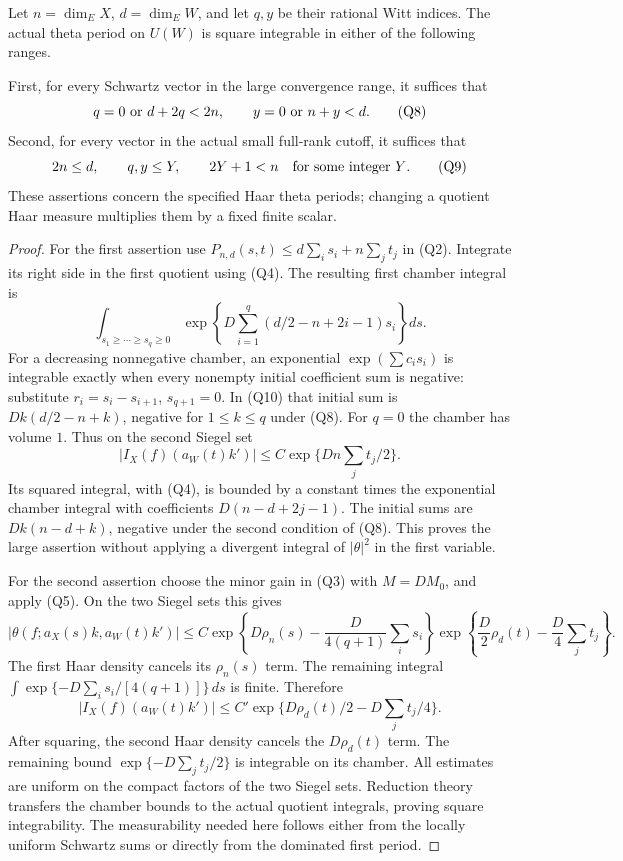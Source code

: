 \begin{srproposition}
\label{prop:sr-theta-period-L2}
Let \(n=\dim_E X\), \(d=\dim_E W\), and let \(q,y\) be their
rational Witt indices. The actual theta period on \(U(W)\) is
square integrable in either of the following ranges.

First, for every Schwartz vector in the large convergence range,
it suffices that
\[
          q=0\ \hbox{or}\ d+2q<2n,\qquad
          y=0\ \hbox{or}\ n+y<d .
 \tag{Q8}\label{eq:sr-theta-period-L2-large-range}
\]
Second, for every vector in the actual small full-rank cutoff,
it suffices that
\[
       2n\le d,\qquad
       q,y\le Y,\qquad 2Y+1<n
                     \quad\hbox{for some integer \(Y\)}.
 \tag{Q9}\label{eq:sr-theta-period-L2-small-range}
\]
These assertions concern the specified Haar theta periods; changing a
quotient Haar measure multiplies them by a fixed finite scalar.
\end{srproposition}

\begin{proof}
For the first assertion use
\(P_{n,d}(s,t)\le d\sum_i s_i+n\sum_jt_j\) in (Q2).
Integrate its right side in the first quotient using (Q4).
The resulting first chamber integral is
\[
 \int_{s_1\ge\cdots\ge s_q\ge0}
   \exp\left\{D\sum_{i=1}^q(d/2-n+2i-1)s_i\right\}ds.
 \tag{Q10}\label{eq:sr-theta-period-L2-first-integral}
\]
For a decreasing nonnegative chamber, an exponential
\(\exp(\sum c_i s_i)\) is integrable exactly when every nonempty
initial coefficient sum is negative: substitute
\(r_i=s_i-s_{i+1}\), \(s_{q+1}=0\).
In (Q10) that initial sum is
\(Dk(d/2-n+k)\), negative for \(1\le k\le q\) under (Q8).
For \(q=0\) the chamber has volume \(1\).
Thus on the second Siegel set
\[
        |I_X(f)(a_W(t)k')|
               \le C\exp\{Dn\sum_jt_j/2\}.
\]
Its squared integral, with (Q4), is bounded by a constant times the
exponential chamber integral with coefficients
\(D(n-d+2j-1)\). The initial sums are \(Dk(n-d+k)\),
negative under the second condition of (Q8). This proves the large
assertion without applying a divergent integral of \(|\theta|^2\)
in the first variable.

For the second assertion choose the minor gain in (Q3) with
\(M=DM_0\), and apply (Q5). On the two Siegel sets this gives
\[
 |\theta(f;a_X(s)k,a_W(t)k')|
 \le C
 \exp\left\{D\rho_n(s)-\frac{D}{4(q+1)}\sum_i s_i\right\}
 \exp\left\{\frac D2\rho_d(t)-\frac D4\sum_j t_j\right\}.
 \tag{Q11}\label{eq:sr-theta-period-L2-separated}
\]
The first Haar density cancels its \(\rho_n(s)\) term.
The remaining integral
\(\int\exp\{-D\sum_i s_i/[4(q+1)]\}\,ds\) is finite.
Therefore
\[
 |I_X(f)(a_W(t)k')|
       \le C'\exp\{D\rho_d(t)/2-D\sum_jt_j/4\}.
\]
After squaring, the second Haar density cancels the
\(D\rho_d(t)\) term. The remaining bound
\(\exp\{-D\sum_jt_j/2\}\) is integrable on its chamber.
All estimates are uniform on the compact factors of the two
Siegel sets. Reduction theory transfers the chamber bounds to
the actual quotient integrals, proving square integrability.
The measurability needed here follows either from the locally
uniform Schwartz sums or directly from the dominated first period.
\end{proof}

